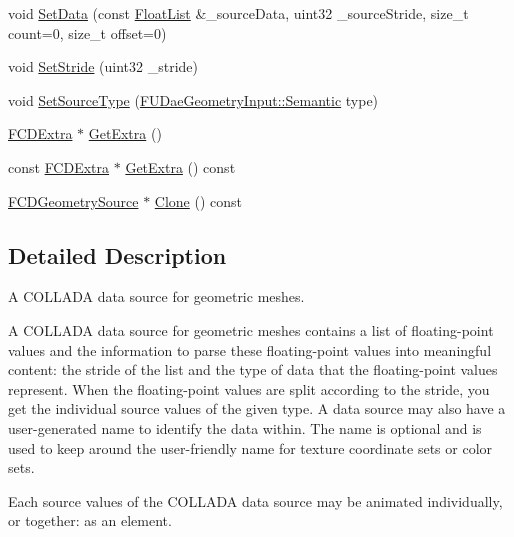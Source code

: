 \begin{DoxyCompactItemize}
\item 
void \hyperlink{classFCDGeometrySource_af42830becb886962cdcb345c05def0d3}{SetData} (const \hyperlink{classfm_1_1vector}{FloatList} \&\_\-sourceData, uint32 \_\-sourceStride, size\_\-t count=0, size\_\-t offset=0)
\item 
void \hyperlink{classFCDGeometrySource_a24b59fdf6b4a8732e57124c197d34c2d}{SetStride} (uint32 \_\-stride)
\item 
void \hyperlink{classFCDGeometrySource_ada666b2bf53d7c96c8116da04d06ae6f}{SetSourceType} (\hyperlink{namespaceFUDaeGeometryInput_a0f887d29f54b10338ebcf73789a7a061}{FUDaeGeometryInput::Semantic} type)
\item 
\hyperlink{classFCDExtra}{FCDExtra} $\ast$ \hyperlink{classFCDGeometrySource_a3bb420a157eab5853e162757d528add2}{GetExtra} ()
\item 
const \hyperlink{classFCDExtra}{FCDExtra} $\ast$ \hyperlink{classFCDGeometrySource_ae2eb04c56a3041d79fda59e9df13e5a5}{GetExtra} () const 
\item 
\hyperlink{classFCDGeometrySource}{FCDGeometrySource} $\ast$ \hyperlink{classFCDGeometrySource_ac06f878ba71c0d70e36b0f8dee2370b1}{Clone} () const 
\end{DoxyCompactItemize}


\subsection{Detailed Description}
A COLLADA data source for geometric meshes.

A COLLADA data source for geometric meshes contains a list of floating-\/point values and the information to parse these floating-\/point values into meaningful content: the stride of the list and the type of data that the floating-\/point values represent. When the floating-\/point values are split according to the stride, you get the individual source values of the given type. A data source may also have a user-\/generated name to identify the data within. The name is optional and is used to keep around the user-\/friendly name for texture coordinate sets or color sets.

Each source values of the COLLADA data source may be animated individually, or together: as an element. 

